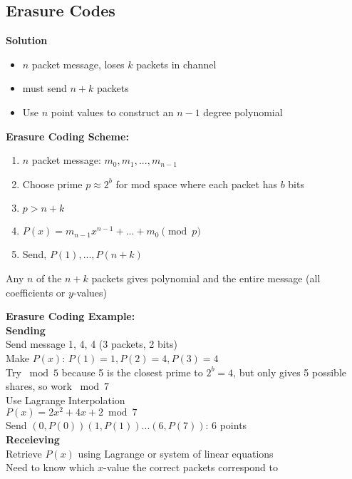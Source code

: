 \documentclass{article}\usepackage{amsmath,amssymb,amsthm,tikz,tkz-graph,color,chngpage,soul,hyperref,csquotes,graphicx,floatrow, listings,polynom}\newcommand*{\QEDB}{\hfill\ensuremath{\square}}\newtheorem*{prop}{Proposition}\renewcommand{\theenumi}{\alph{enumi}}\usepackage[shortlabels]{enumitem}\usepackage[nobreak=true]{mdframed}\usetikzlibrary{matrix,calc}\MakeOuterQuote{"}\usepackage[margin=0.75in]{geometry} \newtheorem{theorem}{Theorem}\newcommand{\Z}{\mathbb Z}\newcommand{\R}{\mathbb R}\newcommand{\Q}{\mathbb Q}\newcommand{\N}{\mathbb N}\newcommand{\x}[1]{\textrm{ #1 }}\newcommand{\pr}{\textrm{Pr}}
\begin{document}
\subsection*{Erasure Codes}
\textbf{Solution}
\begin{itemize}
\item $n$ packet message, loses $k$ packets in channel
\item must send $n+k$ packets
\item Use $n$ point values to construct an $n-1$ degree polynomial
\end{itemize}
\begin{mdframed}
\textbf{Erasure Coding Scheme:}
\begin{enumerate}[1.]
\item $n$ packet message: $m_0, m_1, ... , m_{n-1}$
\item Choose prime $p \approx 2^b$ for mod space where each packet has $b$ bits
\item $p > n+k$
\item $P(x) = m_{n-1}x^{n-1} + ... + m_0 \pmod{p}$
\item Send, $P(1), ..., P(n+k)$
\end{enumerate}
Any $n$ of the $n+k$ packets gives polynomial and the entire message (all coefficients or $y$-values)
\end{mdframed}
\begin{mdframed}
\textbf{Erasure Coding Example:}\\
\textbf{Sending}\\
Send message 1, 4, 4 (3 packets, 2 bits)\\
Make $P(x)$: $P(1) = 1, P(2) = 4, P(3) = 4$\\
Try $\bmod 5$ because 5 is the closest prime to $2^b = 4$, but only gives 5 possible shares, so work $\bmod 7$\\
Use Lagrange Interpolation\\
$P(x) = 2x^2 + 4x + 2 \bmod 7$\\
Send $(0, P(0))(1,P(1))...(6,P(7))$: 6 points\\
\textbf{Receieving}\\
Retrieve $P(x)$ using Lagrange or system of linear equations\\
Need to know which $x$-value the correct packets correspond to\\
\end{mdframed}

\pagebreak
\end{document}
